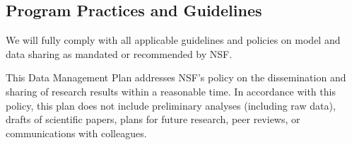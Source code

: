 \documentclass[11pt]{NSFamsart}
\begin{document}
\subsection*{Program Practices and Guidelines} We will fully comply with all applicable guidelines and policies on model and data sharing as mandated or recommended by NSF.

This Data Management Plan addresses NSF’s policy on the dissemination and sharing of research results within a reasonable time.  In accordance with this policy, this plan does not include preliminary analyses (including raw data), drafts of scientific papers, plans for future research, peer reviews, or communications with colleagues. 
\end{document}
